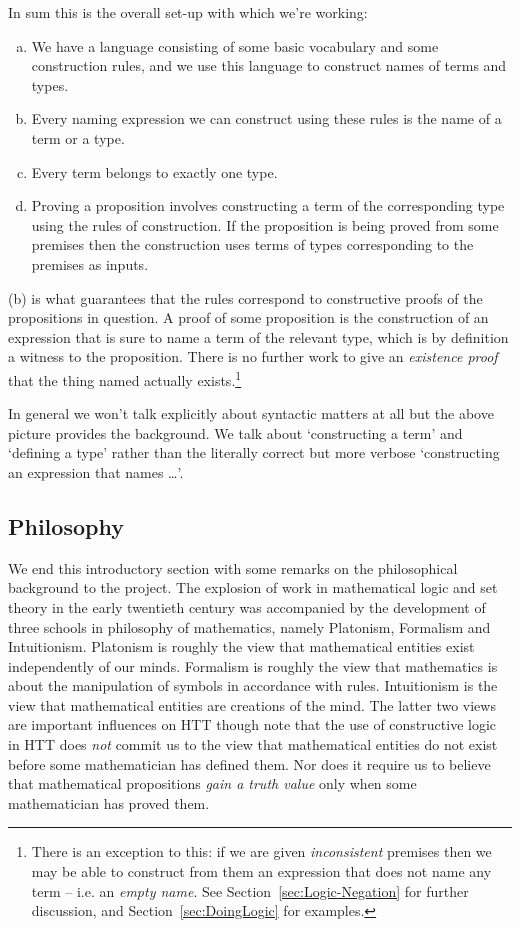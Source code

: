 In sum this is the overall set-up with which we're working:
\begin{enumerate}[(a)]
\item 
We have a language consisting of some basic vocabulary and some construction rules, and we use this language to construct names of terms and types.
\item
Every naming expression we can construct using these rules is the name of a term or a type.
\item
Every term belongs to exactly one type.
\item
Proving a proposition involves constructing a term of the corresponding type using the rules of construction. If the proposition is being proved from some premises then the construction uses terms of types corresponding to the premises as inputs.
\end{enumerate}

(b) is what guarantees that the rules correspond to constructive proofs of the propositions in question. A proof of some proposition is the construction of an expression that is  sure to name a term of the relevant type, which is by definition a witness to the proposition. There is no further work to give an \emph{existence proof} that the thing named actually exists.\footnote{
\label{fn:empty-names}
There is an exception to this: if we are given \emph{inconsistent} premises then we may be able to construct from them an expression that does not name any term -- i.e. an \emph{empty name}.  See 
Section~\ref{sec:Logic-Negation} for further discussion, and 
Section~\ref{sec:DoingLogic} for examples.
}

In general we won't talk explicitly about syntactic matters at all but the above picture provides the background.  We talk about `constructing a term' and `defining a type' rather than the literally correct but more verbose `constructing an expression that names \ldots'.

\subsection{Philosophy}
\label{sec:TypeTheory-Philosophy}

We end this introductory section with some remarks on the philosophical background to the project. The explosion of work in mathematical logic and set theory in the early twentieth century was accompanied by the development of three schools in philosophy of mathematics, namely Platonism, Formalism and Intuitionism. Platonism is roughly the view that mathematical entities exist independently of our minds. Formalism is roughly the view that mathematics is about the manipulation of symbols in accordance with rules. Intuitionism is the view that mathematical entities are creations of the mind. The latter two views are important influences on HTT though note that the use of constructive logic in HTT does \emph{not} commit us to the view that mathematical entities do not exist before some mathematician has defined them. Nor does it require us to believe that mathematical propositions \emph{gain a truth value} only when some mathematician has proved them.

